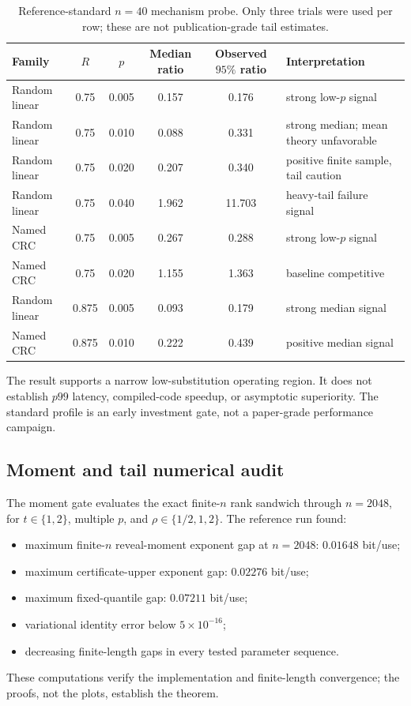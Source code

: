 \documentclass[11pt]{article}
\theoremstyle{definition}
\theoremstyle{remark}
\begin{document}
\begin{table}[h]
\centering
\caption{Reference-standard $n=40$ mechanism probe.  Only three trials were used per row; these are not publication-grade tail estimates.}
\begin{tabularx}{\textwidth}{@{}lccccX@{}}
\toprule
Family & $R$ & $p$ & Median ratio & Observed $95\%$ ratio & Interpretation \\
\midrule
Random linear & 0.75 & 0.005 & 0.157 & 0.176 & strong low-$p$ signal \\
Random linear & 0.75 & 0.010 & 0.088 & 0.331 & strong median; mean theory unfavorable \\
Random linear & 0.75 & 0.020 & 0.207 & 0.340 & positive finite sample, tail caution \\
Random linear & 0.75 & 0.040 & 1.962 & 11.703 & heavy-tail failure signal \\
Named CRC & 0.75 & 0.005 & 0.267 & 0.288 & strong low-$p$ signal \\
Named CRC & 0.75 & 0.020 & 1.155 & 1.363 & baseline competitive \\
Random linear & 0.875 & 0.005 & 0.093 & 0.179 & strong median signal \\
Named CRC & 0.875 & 0.010 & 0.222 & 0.439 & positive median signal \\
\bottomrule
\end{tabularx}
\end{table}

The result supports a narrow low-substitution operating region.  It does not establish $p99$ latency, compiled-code speedup, or asymptotic superiority.  The standard profile is an early investment gate, not a paper-grade performance campaign.

\subsection{Moment and tail numerical audit}
The moment gate evaluates the exact finite-$n$ rank sandwich through $n=2048$, for $t\in\{1,2\}$, multiple $p$, and $\rho\in\{1/2,1,2\}$.  The reference run found:
\begin{itemize}[leftmargin=2em]
\item maximum finite-$n$ reveal-moment exponent gap at $n=2048$: $0.01648$ bit/use;
\item maximum certificate-upper exponent gap: $0.02276$ bit/use;
\item maximum fixed-quantile gap: $0.07211$ bit/use;
\item variational identity error below $5\times10^{-16}$;
\item decreasing finite-length gaps in every tested parameter sequence.
\end{itemize}
These computations verify the implementation and finite-length convergence; the proofs, not the plots, establish the theorem.
\end{document}
